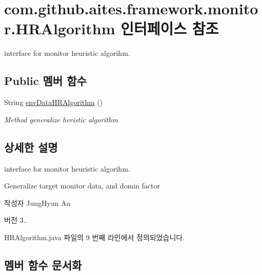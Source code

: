 \hypertarget{interfacecom_1_1github_1_1aites_1_1framework_1_1monitor_1_1_h_r_algorithm}{}\section{com.\+github.\+aites.\+framework.\+monitor.\+H\+R\+Algorithm 인터페이스 참조}
\label{interfacecom_1_1github_1_1aites_1_1framework_1_1monitor_1_1_h_r_algorithm}


interface for monitor heuristic algorihm.  


\subsection*{Public 멤버 함수}
\begin{DoxyCompactItemize}
\item 
String \mbox{\hyperlink{interfacecom_1_1github_1_1aites_1_1framework_1_1monitor_1_1_h_r_algorithm_a6bef5d29d5e5e96ed00c105aaede9ff5}{env\+Data\+H\+R\+Algorithm}} ()
\begin{DoxyCompactList}\small\item\em Method generalize heristic algorithm \end{DoxyCompactList}\end{DoxyCompactItemize}


\subsection{상세한 설명}
interface for monitor heuristic algorihm. 

Generalize target monitor data, and domin factor \begin{DoxyAuthor}{작성자}
Jung\+Hyun An 
\end{DoxyAuthor}
\begin{DoxyVersion}{버전}
3.. 
\end{DoxyVersion}


H\+R\+Algorithm.\+java 파일의 9 번째 라인에서 정의되었습니다.



\subsection{멤버 함수 문서화}
\mbox{\label{interfacecom_1_1github_1_1aites_1_1framework_1_1monitor_1_1_h_r_algorithm_a6bef5d29d5e5e96ed00c105aaede9ff5}} 
